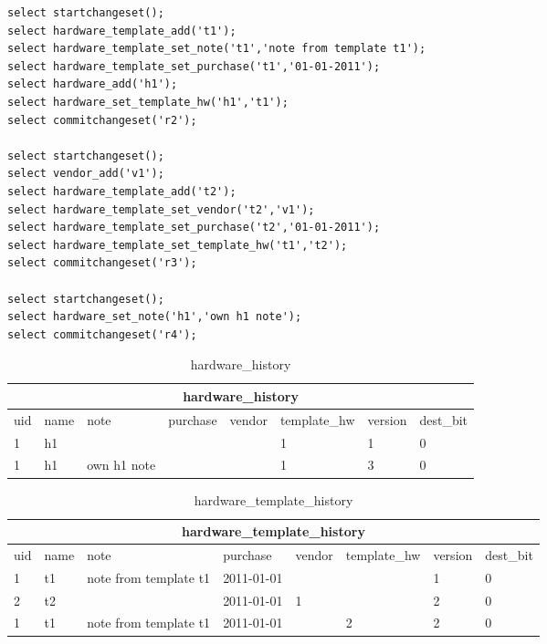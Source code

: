 \documentclass[deska]{subfiles}
\begin{document}
\begin{verbatim}
select startchangeset();
select hardware_template_add('t1');
select hardware_template_set_note('t1','note from template t1');
select hardware_template_set_purchase('t1','01-01-2011');
select hardware_add('h1');
select hardware_set_template_hw('h1','t1');
select commitchangeset('r2');

select startchangeset();
select vendor_add('v1');
select hardware_template_add('t2');
select hardware_template_set_vendor('t2','v1');
select hardware_template_set_purchase('t2','01-01-2011');
select hardware_template_set_template_hw('t1','t2');
select commitchangeset('r3');

select startchangeset();
select hardware_set_note('h1','own h1 note');
select commitchangeset('r4');
\end{verbatim}

\begin{center}

\begin{table}
    \caption{hardware\_history}
    \label{tab-templ-hwhist}
\begin{tabular}{ | l | l | l | l | l | l | l | l | }
    \hline
    \multicolumn{8}{|c|}{hardware\_history}\\
    \hline
    uid & name & note & purchase & vendor & template\_hw & version & dest\_bit\\
    \hline
    1 & h1 &  &  &  & 1 & 1 & 0\\
    1 & h1 & own h1 note &  &  & 1 & 3 & 0\\
    \hline
\end{tabular}
\end{table}

\begin{table}
    \caption{hardware\_template\_history}
    \label{tab-templ-hwtemplhist}
\begin{tabular}{ | l | l | l | l | l | l | l | l | }
    \hline
    \multicolumn{8}{|c|}{hardware\_template\_history}\\
    \hline
    uid & name & note & purchase & vendor & template\_hw & version & dest\_bit\\
    \hline
    1 & t1 & note from template t1 & 2011-01-01 &  &  & 1 & 0\\
    2 & t2 &  & 2011-01-01 & 1 &  & 2 & 0\\
    1 & t1 & note from template t1 & 2011-01-01 &  & 2 & 2 & 0\\
    \hline
\end{tabular}
\end{table}

\end{center}
\end{document}
